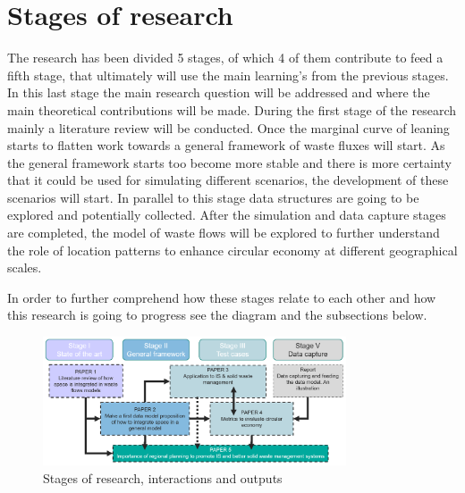 \section{Stages of research}
The research has been divided 5 stages, of which 4 of them contribute to feed a fifth stage, that ultimately will use the main learning's from the previous stages. In this last stage the main research question will be addressed and where the main theoretical contributions will be made. During the first stage of the research mainly a literature review will be conducted. Once the marginal curve of leaning starts to flatten work towards a general framework of waste fluxes will start. As the general framework starts too become more stable and there is more certainty that it could be used for simulating different scenarios, the development of these scenarios will start. In parallel to this stage data structures are going to be explored and potentially collected. After the simulation and data capture stages are completed, the model of waste flows will be explored to further understand the role of location patterns to enhance circular economy at different geographical scales. 



In order to further comprehend how these stages relate to each other and how this research is going to progress see the diagram and the subsections below.

\begin{figure}[h!]
    \centering
    \includegraphics[width=0.8\textwidth]{sections/asset/stage2.PNG}
    \caption{Stages of research, interactions and outputs}
    \label{fig:research2}
\end{figure}






